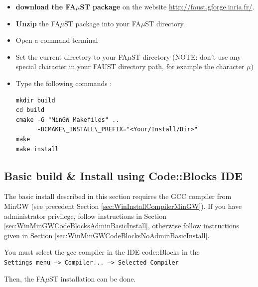 \begin{itemize}
\item \textbf{download the FA$\mu$ST package} on the website  \url{http://faust.gforge.inria.fr/}. 
\item \textbf{Unzip} the FA$\mu$ST package into your FA$\mu$ST directory. 

\item Open a command terminal
\item Set the current directory to your FA$\mu$ST directory (NOTE: don't use any special character in your FAUST directory path, for example the character $\mu$)
\item Type the following commands : 
\begin{lstlisting}
mkdir build
cd build
cmake -G "MinGW Makefiles" .. 
	  -DCMAKE\_INSTALL\_PREFIX="<Your/Install/Dir>"
make
make install 
\end{lstlisting}
\end{itemize}


\subsection{Basic build \& Install using Code::Blocks IDE}
\label{sec:WinCodeBlocksBasicInstall}

The basic install described in this section requires the GCC compiler from MinGW (see precedent Section \ref{sec:WinInstallCompilerMinGW}).
If you have administrator privilege, follow instructions in Section \ref{sec:WinMinGWCodeBlocksAdminBasicInstall}, otherwise follow instructions given in Section \ref{sec:WinMinGWCodeBlocksNoAdminBasicInstall}.

You must select the gcc compiler in the IDE code::Blocks in the \\ \texttt{Settings menu --> Compiler... --> Selected Compiler }  

Then, the FA$\mu$ST installation can be done. 

